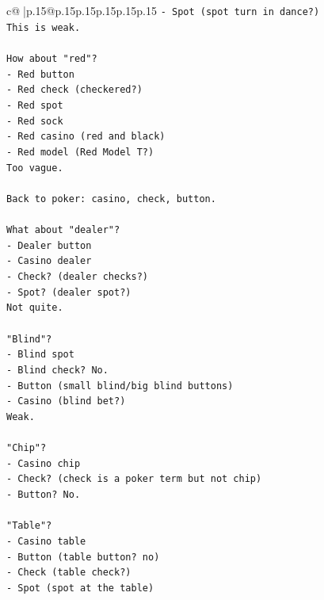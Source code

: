 \documentclass{article}
\begin{document}
{\begin{supertabular}{c@{$\;$}|p{.15\linewidth}@{}p{.15\linewidth}p{.15\linewidth}p{.15\linewidth}p{.15\linewidth}p{.15\linewidth}}
{{{\texttt{{-} Spot (spot turn in dance?)} \\
\texttt{This is weak.} \\
\\ 
\texttt{How about "red"?} \\
\texttt{{-} Red button} \\
\texttt{{-} Red check (checkered?)} \\
\texttt{{-} Red spot} \\
\texttt{{-} Red sock} \\
\texttt{{-} Red casino (red and black)} \\
\texttt{{-} Red model (Red Model T?)} \\
\texttt{Too vague.} \\
\\ 
\texttt{Back to poker: casino, check, button.} \\
\\ 
\texttt{What about "dealer"?} \\
\texttt{{-} Dealer button} \\
\texttt{{-} Casino dealer} \\
\texttt{{-} Check? (dealer checks?)} \\
\texttt{{-} Spot? (dealer spot?)} \\
\texttt{Not quite.} \\
\\ 
\texttt{"Blind"?} \\
\texttt{{-} Blind spot} \\
\texttt{{-} Blind check? No.} \\
\texttt{{-} Button (small blind/big blind buttons)} \\
\texttt{{-} Casino (blind bet?)} \\
\texttt{Weak.} \\
\\ 
\texttt{"Chip"?} \\
\texttt{{-} Casino chip} \\
\texttt{{-} Check? (check is a poker term but not chip)} \\
\texttt{{-} Button? No.} \\
\\ 
\texttt{"Table"?} \\
\texttt{{-} Casino table} \\
\texttt{{-} Button (table button? no)} \\
\texttt{{-} Check (table check?)} \\
\texttt{{-} Spot (spot at the table)} \\
}}}
\end{supertabular}}
\end{document}
